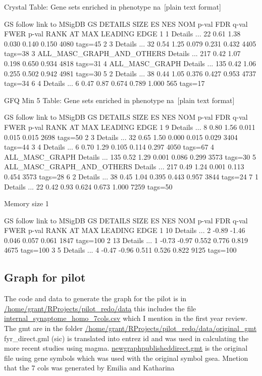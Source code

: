 Crystal
Table: Gene sets enriched in phenotype na [plain text format]

GS
follow link to MSigDB
GS DETAILS
SIZE
ES
NES
NOM p-val
FDR q-val
FWER p-val
RANK AT MAX
LEADING EDGE
1
1
Details ...
22
0.61
1.38
0.030
0.140
0.150
4080
tags=45%
2
3
Details ...
32
0.54
1.25
0.079
0.231
0.432
4405
tags=38%
3
ALL\_MASC\_GRAPH\_AND\_OTHERS
Details ...
217
0.42
1.07
0.198
0.650
0.934
4818
tags=31%
4
ALL\_MASC\_GRAPH
Details ...
135
0.42
1.06
0.255
0.502
0.942
4981
tags=30%
5
2
Details ...
38
0.44
1.05
0.376
0.427
0.953
4737
tags=34%
6
4
Details ...
6
0.47
0.87
0.674
0.789
1.000
565
tags=17%

GFQ
Min 5
Table: Gene sets enriched in phenotype na [plain text format]

GS
follow link to MSigDB
GS DETAILS
SIZE
ES
NES
NOM p-val
FDR q-val
FWER p-val
RANK AT MAX
LEADING EDGE
1
9
Details ...
8
0.80
1.56
0.011
0.015
0.015
2698
tags=50%
2
3
Details ...
32
0.65
1.50
0.000
0.015
0.029
3404
tags=44%
3
4
Details ...
6
0.70
1.29
0.105
0.114
0.297
4050
tags=67%
4
ALL\_MASC\_GRAPH
Details ...
135
0.52
1.29
0.001
0.086
0.299
3573
tags=30%
5
ALL\_MASC\_GRAPH\_AND\_OTHERS
Details ...
217
0.49
1.24
0.001
0.113
0.454
3573
tags=28%
6
2
Details ...
38
0.45
1.04
0.395
0.443
0.957
3844
tags=24%
7
1
Details ...
22
0.42
0.93
0.624
0.673
1.000
7259
tags=50%


Memory size 1


GS
follow link to MSigDB
GS DETAILS
SIZE
ES
NES
NOM p-val
FDR q-val
FWER p-val
RANK AT MAX
LEADING EDGE
1
10
Details ...
2
-0.89
-1.46
0.046
0.057
0.061
1847
tags=100%
2
13
Details ...
1
-0.73
-0.97
0.552
0.776
0.819
4675
tags=100%
3
5
Details ...
4
-0.47
-0.96
0.511
0.526
0.822
9125
tags=100%

\subsection{Graph for pilot}
The code and data to generate the graph for the pilot is in \url{/home/grant/RProjects/pilot_redo/data} this includes the file 
\url{internal_synaptome_homo_7cols.csv} which I mention in the first year review. The gmt are in the folder \url{/home/grant/RProjects/pilot_redo/data/original_gmt} fyr\_direct.gml (sic) is translated into entrez id and was used in calculating the more recent studies using magma. \url{ newgraphpublisheddirect.gmt} is the original file using gene symbols which was used with the original symbol gsea. Mnetion that the 7 cols was generated by Emilia and Katharina

